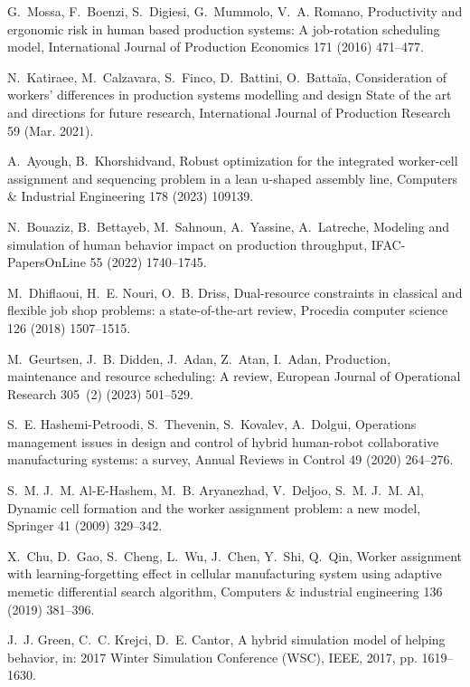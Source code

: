 \documentclass[review,12pt, 3p, times]{elsarticle}
\begin{document}
\begin{thebibliography}{00}
G.~Mossa, F.~Boenzi, S.~Digiesi, G.~Mummolo, V.~A. Romano, {Productivity and
  ergonomic risk in human based production systems: A job-rotation scheduling
  model}, International Journal of Production Economics 171 (2016) 471--477.

N.~Katiraee, M.~Calzavara, S.~Finco, D.~Battini, O.~Battaïa, Consideration of
  workers’ differences in production systems modelling and design {State} of
  the art and directions for future research, International Journal of
  Production Research 59 (Mar. 2021).

A.~Ayough, B.~Khorshidvand, Robust optimization for the integrated worker-cell
  assignment and sequencing problem in a lean u-shaped assembly line, Computers
  \& Industrial Engineering 178 (2023) 109139.

N.~Bouaziz, B.~Bettayeb, M.~Sahnoun, A.~Yassine, A.~Latreche, Modeling and
  simulation of human behavior impact on production throughput,
  IFAC-PapersOnLine 55 (2022) 1740--1745.

M.~Dhiflaoui, H.~E. Nouri, O.~B. Driss, Dual-resource constraints in classical
  and flexible job shop problems: a state-of-the-art review, Procedia computer
  science 126 (2018) 1507--1515.

M.~Geurtsen, J.~B. Didden, J.~Adan, Z.~Atan, I.~Adan, Production, maintenance
  and resource scheduling: A review, European Journal of Operational Research
  305~(2) (2023) 501--529.

S.~E. Hashemi-Petroodi, S.~Thevenin, S.~Kovalev, A.~Dolgui, Operations
  management issues in design and control of hybrid human-robot collaborative
  manufacturing systems: a survey, Annual Reviews in Control 49 (2020)
  264--276.

S.~M. J.~M. Al-E-Hashem, M.~B. Aryanezhad, V.~Deljoo, S.~M. J.~M. Al, Dynamic
  cell formation and the worker assignment problem: a new model, Springer 41
  (2009) 329--342.

X.~Chu, D.~Gao, S.~Cheng, L.~Wu, J.~Chen, Y.~Shi, Q.~Qin, Worker assignment
  with learning-forgetting effect in cellular manufacturing system using
  adaptive memetic differential search algorithm, Computers \& industrial
  engineering 136 (2019) 381--396.

J.~J. Green, C.~C. Krejci, D.~E. Cantor, A hybrid simulation model of helping
  behavior, in: 2017 Winter Simulation Conference (WSC), IEEE, 2017, pp.
  1619--1630.


\end{thebibliography}
\end{document}
